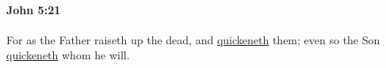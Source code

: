 			\begin{framed}
			\scriptsize
				\begin{compactdesc}
					\item[SBLG] 
				\end{compactdesc}
			\end{framed}

		\paragraph{John 5:21} %
			\label{JOHN-5-21}

			For as the Father raiseth up the dead, and \hyperref[QUICKEN]{quickeneth} them; even so the Son \hyperref[QUICKEN]{quickeneth} whom he will.

			\begin{framed}
			\scriptsize
				\begin{compactdesc}
					\item[SBLG]  \hyperref[ZOOPOIEO]{} \hyperref[ZOOPOIEO]{\grl{ζῳοποιεῖ}}\gr{.}
				\end{compactdesc}
			\end{framed}

